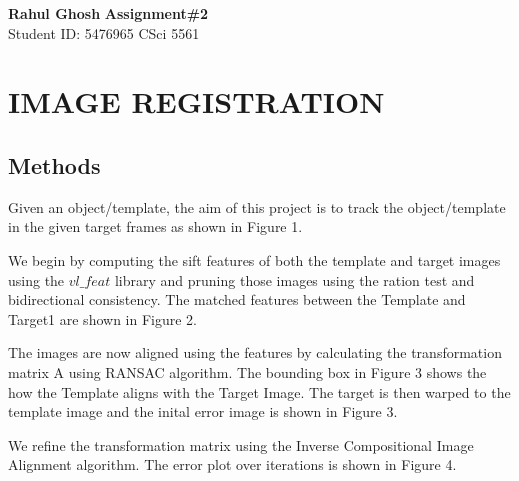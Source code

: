 \documentclass[letter, 10pt]{article}
\begin{document}
\noindent
\large \textbf{Rahul Ghosh} \hfill \textbf{Assignment\#2}\\
\normalsize Student ID: 5476965 \hfill CSci 5561\\

\section*{IMAGE REGISTRATION}
\subsection*{Methods}
Given an object/template, the aim of this project is to track the object/template in the given target frames as shown in Figure 1.


We begin by computing the sift features of both the template and target images using the $vl\_feat$ library and pruning those images using the ration test and bidirectional consistency. The matched features between the Template and Target1 are shown in Figure 2.


The images are now aligned using the features by calculating the transformation matrix A using RANSAC algorithm. The bounding box in Figure 3 shows the how the Template aligns with the Target Image. The target is then warped to the template image and the inital error image is shown in Figure 3.


We refine the transformation matrix using the Inverse Compositional Image Alignment algorithm. The error plot over iterations is shown in Figure 4.
\end{document}
